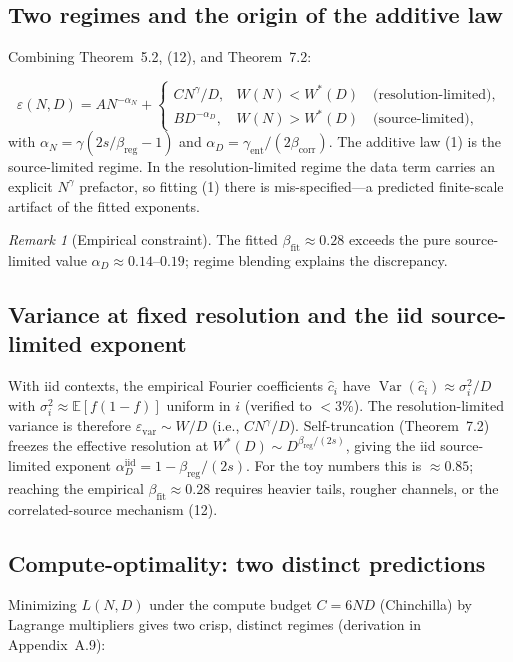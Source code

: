 \documentclass[12pt]{article}
\newcommand{\eps}{\varepsilon}
\newcommand{\E}{\mathbb{E}}
\newcommand{\Var}{\operatorname{Var}}
\theoremstyle{remark}
\newtheorem{remark}{Remark}
\begin{document}
\subsection{Two regimes and the origin of the additive law}
Combining Theorem~5.2, (12), and
Theorem~7.2:

\begin{equation}
  \eps(N,D) = A N^{-\alpha_N}+
  \begin{cases}
    C N^{\gamma}/D, & W(N)<W^*(D)\quad \text{(resolution-limited)}, \\
    B D^{-\alpha_D}, & W(N)>W^*(D)\quad \text{(source-limited)},
  \end{cases}
  \label{eq:regimes}
\end{equation}
with $\alpha_N=\gamma(2s/\beta_{\mathrm{reg}}-1)$ and
$\alpha_D=\gamma_{\mathrm{ent}}/(2\beta_{\mathrm{corr}})$. The additive law
(1) is the source-limited regime. In the resolution-limited regime
the data term carries an explicit $N^\gamma$ prefactor, so fitting
(1) there is mis-specified---a predicted finite-scale artifact of
the fitted exponents.

\begin{remark}[Empirical constraint]
\label{rem:empirical}
The fitted $\beta_{\mathrm{fit}}\approx0.28$ exceeds the pure source-limited value
$\alpha_D\approx0.14$--$0.19$; regime blending explains the discrepancy.
\end{remark}

\subsection{Variance at fixed resolution and the iid source-limited exponent}
With iid contexts, the empirical Fourier coefficients $\hat c_i$ have
$\Var(\hat c_i)\approx\sigma_i^2/D$ with $\sigma_i^2\approx\E[f(1-f)]$
uniform in $i$ (verified to $<3\%$).  The resolution-limited variance is
therefore $\eps_{\mathrm{var}}\sim W/D$ (i.e., $C N^{\gamma}/D$). Self-truncation
(Theorem~7.2) freezes the effective resolution at
$W^*(D)\sim D^{\beta_{\mathrm{reg}}/(2s)}$, giving the iid source-limited exponent
$\alpha_D^{\mathrm{iid}}=1-\beta_{\mathrm{reg}}/(2s)$. For the toy numbers this is
$\approx0.85$; reaching the empirical $\beta_{\mathrm{fit}}\approx0.28$ requires
heavier tails, rougher channels, or the correlated-source mechanism
(12).

\subsection{Compute-optimality: two distinct predictions}
Minimizing $L(N,D)$ under the compute budget $C=6ND$ (Chinchilla) by
Lagrange multipliers gives two crisp, distinct regimes (derivation in
Appendix~A.9):
\end{document}
